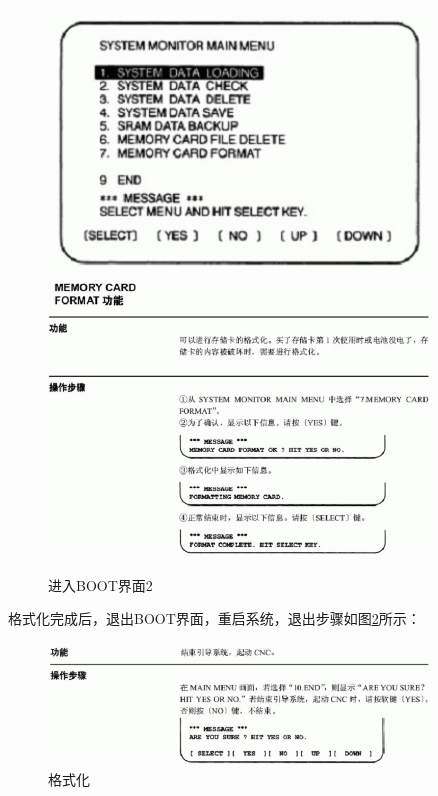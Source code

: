 \begin{figure}[!hbtp]
\centering	\includegraphics[width=0.9\textwidth]{images/14-4}
\centering	\includegraphics[width=0.9\textwidth]{images/14-5}
\caption{进入BOOT界面2} \label{进入BOOT界面1}
\end{figure}

格式化完成后，退出BOOT界面，重启系统，退出步骤如图\ref{格式化}所示：
\begin{figure}[!hbtp]
	\centering	\includegraphics[width=0.9\textwidth]{images/14-6}
	\caption{格式化} \label{格式化}
\end{figure}

